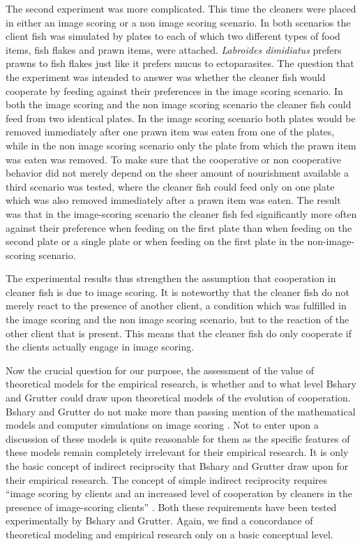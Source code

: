 The second experiment was more complicated. This time the cleaners were placed
in either an image scoring or a non image scoring scenario. In both
scenarios the client fish was simulated by plates to each of which two different types
of food items, fish flakes and prawn items, were attached. {\em Labroides
  dimidiatus} prefers prawns to fish flakes just like it prefers mucus to
ectoparasites. The question that the experiment was intended to answer was
whether the cleaner fish would cooperate by feeding against their preferences
in the image scoring scenario. In both the image scoring and the non image
scoring scenario the cleaner fish could feed from two identical plates. In the image
scoring scenario both plates would be removed immediately after one prawn item
was eaten from one of the plates, while in the non image scoring scenario only
the plate from which the prawn item was eaten was removed. To make sure that
the cooperative or non cooperative behavior did not merely depend on the
sheer amount of nourishment available a third scenario was tested, where the
cleaner fish could feed only on one plate which was also removed immediately
after a prawn item was eaten. The result was that in the image-scoring
scenario the cleaner fish fed significantly more often against their
preference when feeding on the first plate than when feeding on the second
plate or a single plate or when feeding on the first plate in the
non-image-scoring scenario.

The experimental results thus strengthen the assumption that cooperation in
cleaner fish is due to image scoring. It is noteworthy that the cleaner
fish do not merely react to the presence of another client, a condition
which was fulfilled in the image scoring and the non image scoring
scenario, but to the reaction of the other client that is present. This means
that the cleaner fish do only cooperate if the clients actually engage in
image scoring.

Now the crucial question for our purpose, the assessment of the value of
theoretical models for the empirical research, is whether and to what level
Bshary and Grutter could draw upon theoretical models of the evolution of
cooperation. Bshary and Grutter do not make more than passing mention of the
mathematical models and computer simulations on image scoring \cite[p.\ 
975]{bshary-grutter:2006}. Not to enter upon a discussion of these models is
quite reasonable for them as the specific features of these models remain
completely irrelevant for their empirical research. It is only the basic
concept of indirect reciprocity that Bshary and Grutter draw upon for their
empirical research. The concept of simple indirect reciprocity requires
``image scoring by clients and an increased level of cooperation by cleaners
in the presence of image-scoring clients'' \cite[p.\ 796]{bshary-grutter:2006}.
Both these requirements have been tested experimentally by Bshary and Grutter.
Again, we find a concordance of theoretical modeling and empirical research
only on a basic conceptual level.


